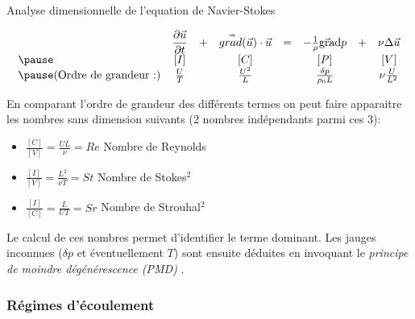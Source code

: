 \begin{frame}{Analyse dimensionnelle de l'equation de Navier-Stokes}
\pause
\smallskip



$$ 
\begin{array}{lccccccc} 
\displaystyle
 &
\dpdt{\myvec{u}} & + &  \mytensor{grad} (\myvec{u}) \cdot \myvec{u} 
&=& 
 - \frac{1}{\rho}  \gradient p  &+ & \nu \Delta \myvec{u} 
 \\
 \pause
\displaystyle
&
\left[I\right] && \left[ C \right] && \left[P\right] &&\left[V\right] 
\\
\pause
\displaystyle
\mbox{(Ordre de grandeur :)} &
\frac{U}{T}  && \frac{U^2}{L} && \frac{\delta p}{\rho_0 L}  && \nu \frac{U}{L^2}
\end{array}
$$

\pause 
\medskip

En comparant l'ordre de grandeur des différents termes on peut faire apparaitre les nombres sans dimension suivants (2 nombres indépendants parmi ces 3):

\begin{itemize}
\item $ \frac{[C]}{[V]} = \frac{U L}{\nu} = Re $ {\color{rouge} Nombre de Reynolds}
\item $ \frac{[I]}{[V]} =  \frac{L^2}{\nu T} = St $ {\color{rouge} Nombre de Stokes}$^2$
\item $ \frac{[I]}{[C]} =  \frac{L }{U T} = Sr $  {\color{rouge} Nombre de Strouhal}$^2$ 
\end{itemize}

\pause
\smallskip
Le calcul de ces nombres permet d'identifier le {\color{red} terme  dominant}.
\pause
Les jauges inconnues ($\delta p$ et éventuellement $T$) sont ensuite déduites en invoquant le {\em principe de moindre dégénérescence (PMD)} .


\end{frame}

\subsubsection{Régimes d'écoulement}

